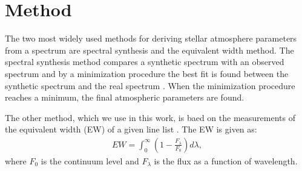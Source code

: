 \documentclass{aa}
\begin{document}






\section{Method}
\label{sec:method}

The two most widely used methods for deriving stellar atmosphere
parameters from a spectrum are spectral synthesis and the equivalent
width method. The spectral synthesis method compares a synthetic
spectrum with an observed spectrum and by a minimization procedure the
best fit is found between the synthetic spectrum and the real spectrum
\citep[see e.g.][]{Valenti2005,Onehag2012,Blanco2014}. When the minimization
procedure reaches a minimum, the final atmospheric parameters are found.

The other method, which we use in this work, is baed on the measurements
of the equivalent width (EW) of a given line
list \citep{Sousa2008a,Bensby2014,Mucciarelli2013}.
The EW is given as:
\begin{align}
    \label{eq:EW}
    EW = \int_0^\infty \left(1 - \frac{F_\lambda}{F_0}\right) d\lambda,
\end{align}
where $F_0$ is the continuum level and $F_\lambda$ is the flux as a
function of wavelength.
\end{document}
